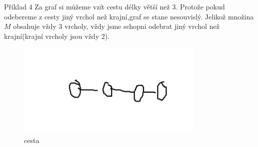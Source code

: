 \documentclass[a4paper]{article}
\begin{document}
    \begin{section}{Příklad 4}
        Za graf si můžeme vzít cestu délky větší než 3. Protože pokud odebereme z cesty jiný vrchol než krajní,graf se stane nesouvislý. Jelikož množina $M$ obsahuje vždy 3 vrcholy, vždy jsme schopni odebrat jiný vrchol než krajní(krajní vrcholy jsou vždy 2).
        \begin{figure}[htpb]
            \centering
            \includegraphics[width=0.8\textwidth]{graf-cesta.png}
            \caption{cesta}
            \label{fig:graf-cesta}
        \end{figure}
        
    \end{section}
\end{document}

